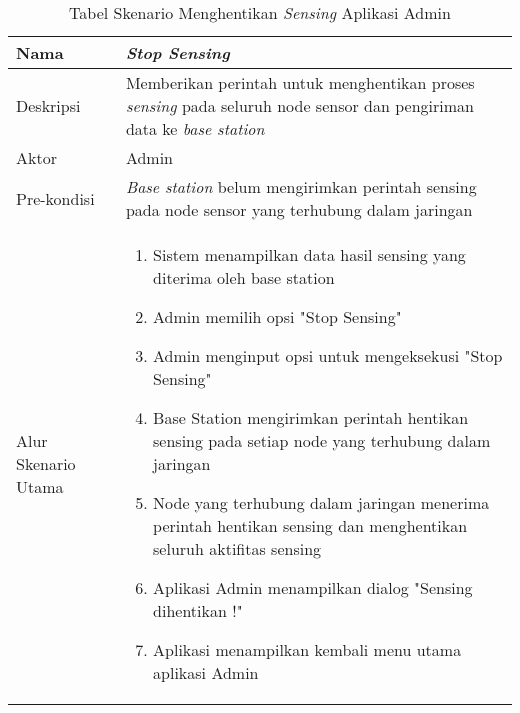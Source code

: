     \begin{table}[H]
        \centering
        \caption{Tabel Skenario Menghentikan \textit{Sensing} Aplikasi Admin}
        \begin{tabular}{|p{3cm}|p{10cm}|}
        \hline
            Nama & \textit{Stop Sensing}\\
        \hline 
        \hline
            Deskripsi & Memberikan perintah untuk menghentikan proses \textit{sensing} pada seluruh node sensor dan pengiriman data ke \textit{base station}\\
        \hline
            Aktor & Admin \\
        \hline
            Pre-kondisi & \textit{Base station} belum mengirimkan perintah sensing pada node sensor yang terhubung dalam jaringan\\
 
        \hline
            Alur Skenario Utama & 
             \begin{enumerate}
                \item Sistem menampilkan data hasil sensing yang diterima oleh base station
                \item Admin memilih opsi "Stop Sensing"                 
                \item Admin menginput opsi untuk mengeksekusi "Stop Sensing" 
                \item Base Station mengirimkan perintah hentikan sensing pada setiap node yang terhubung dalam jaringan
                \item Node yang terhubung dalam jaringan menerima perintah hentikan sensing dan menghentikan seluruh aktifitas sensing
                \item Aplikasi Admin menampilkan dialog "Sensing dihentikan !"
                \item Aplikasi menampilkan kembali menu utama aplikasi Admin
                
            \end{enumerate}\\
        \hline
        \end{tabular}
        \label{tab:skenario4}
    \end{table}
    
    
    
